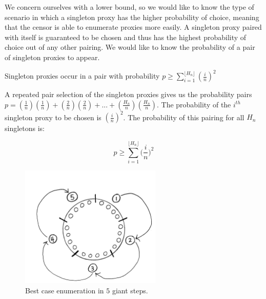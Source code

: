 We concern ourselves with a lower bound, so we would like to know the type of scenario in which a singleton proxy has the higher probability of choice, meaning that the censor is able to enumerate proxies more easily. A singleton proxy paired with itself is guaranteed to be chosen and thus has the highest probability of choice out of any other pairing. We would like to know the probability of a pair of singleton proxies to appear.

\begin{lemma}{Singleton proxies occur in a pair with probability $p \geq \sum_{i=1}^{\lfloor{H_n}\rfloor} (\frac{i}{n})^2$}


A repeated pair selection of the singleton proxies gives us the probability pairs $p=(\frac{1}{n})(\frac{1}{n}) + (\frac{2}{n})(\frac{2}{n}) + ... + (\frac{H_n}{n})(\frac{H_n}{n})$. The probability of the $i^{th}$ singleton proxy to be chosen is $(\frac{i}{n})^2$. The probability of this pairing for all $H_n$ singletons is:

$$p \geq \sum_{i=1}^{\lfloor{H_n}\rfloor} \bigg(\frac{i}{n}\bigg)^2$$

\end{lemma}
\begin{figure}[h!]
\centering
     \includegraphics[width=0.6\textwidth]{fig/almost_flower.png}
    \caption{Best case enumeration in $5$ giant steps.}

    \label{fig:lbgs}
\end{figure}


